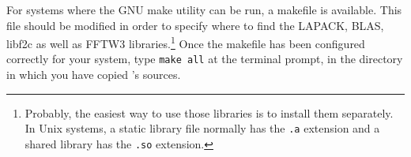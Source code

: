 For systems where the GNU make utility can be run, a makefile is available. 
This file should be modified in order to specify where to find the LAPACK, BLAS, libf2c as well as FFTW3 libraries.\footnote{Probably, the easiest way to use those libraries is to install them separately. In Unix systems, a static library file normally has the \lstinline!.a! extension and a shared library has the \lstinline!.so! extension.} 
Once the makefile has been configured correctly for your system, type \lstinline!make all! at the terminal prompt, in the directory in which you have copied \afmm's sources.

%
